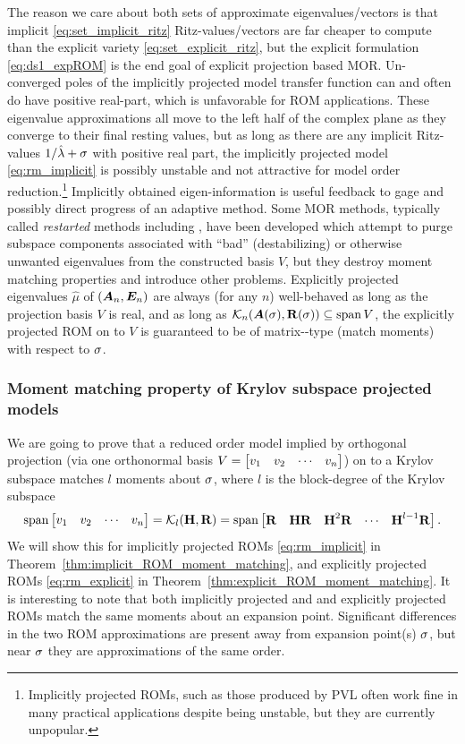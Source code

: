  The reason we care about both sets of approximate eigenvalues/vectors is that implicit \eqref{eq:set_implicit_ritz} Ritz-values/vectors are far cheaper to compute than the explicit variety \eqref{eq:set_explicit_ritz}, but the explicit formulation \eqref{eq:ds1_expROM} is the end goal of explicit projection based MOR.   Un-converged poles of the implicitly projected model transfer function can and often do have positive real-part, which is unfavorable for ROM applications.  These eigenvalue approximations all move to the left half of the complex plane as they converge to their final resting  values, but as long as there are any implicit Ritz-values $1/\hat{\lambda}+\sigma$ with positive real part, the implicitly projected model \eqref{eq:rm_implicit} is possibly unstable and not attractive for model order reduction.\footnote{Implicitly projected ROMs, such as those produced by PVL \cite{PVL} often work fine in many practical applications despite being unstable, but they are currently unpopular.}  Implicitly obtained eigen-information is useful feedback to gage and possibly direct progress of an adaptive method.  
Some MOR methods, typically called \emph{restarted} methods including 
\cite{grimme1996restart,papakos2003deflated,jaimoukha1997implicitMOR,ahmed2001implicit}, have been developed which attempt to purge subspace components associated with ``bad'' (destabilizing) or otherwise unwanted eigenvalues from the constructed basis $V$, but they destroy moment matching properties and introduce other problems.  Explicitly projected eigenvalues $\hat{\mu}$ of $(\bm{A}_n,\bm{E}_n)$ are always (for any $n$) well-behaved as long as the projection basis $V$ is real, and as long as  $\mathcal{K}_{n}({\bm{A}(\sigma)},{\textbf{\textup{R}}(\sigma)})\subseteq \operatorname*{span} V$, the explicitly projected ROM on to $V$ is guaranteed to be of matrix-\pade-type (match moments) with respect to $\sigma$.   

\subsubsection{Moment matching property of Krylov subspace projected models}
We are going to prove that a reduced order model implied by orthogonal  projection (via one orthonormal basis $V=\begin{bmatrix} v_1&v_2&\cdots&v_n\end{bmatrix}$) on to a Krylov subspace matches $l$ moments about $\sigma$, where $l$ is the block-degree of the Krylov subspace 
\[
\operatorname*{span}\begin{bmatrix} v_1&v_2&\cdots&v_n\end{bmatrix} = \mathcal{K}_{l}({\textbf{\textup{H}}},{\textbf{\textup{R}}}) 
= \operatorname*{span}\begin{bmatrix} \textbf{\textup{R}} & \textbf{\textup{H}}\textbf{\textup{R}} & \textbf{\textup{H}}^2\textbf{\textup{R}} & \cdots & \textbf{\textup{H}}^{l-1} \textbf{\textup{R}}\end{bmatrix}.
\] 
 We will show this for implicitly projected ROMs \eqref{eq:rm_implicit} in Theorem~\ref{thm:implicit_ROM_moment_matching}, and explicitly projected ROMs \eqref{eq:rm_explicit} in Theorem~\ref{thm:explicit_ROM_moment_matching}.   It is interesting to note that both implicitly projected and and explicitly projected ROMs match the same moments about an expansion point.  Significant differences in the two ROM approximations are present away from expansion point(s) $\sigma$, but near $\sigma$ they are approximations of the same order.
\medskip

